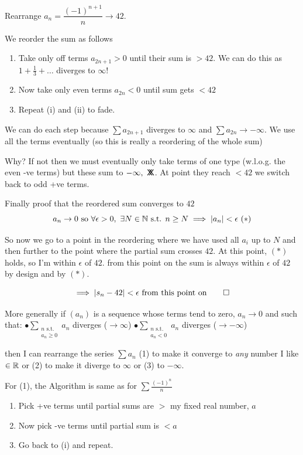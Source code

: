 \documentclass[twoside]{scrartcl}
\newcommand*{\cont}{%
  \mathsf{X}\mkern-8.5mu\mathsf{X}%
}
\begin{document}
\begin{example}
Rearrange $a_n = \dfrac{(-1)^{n+1}}{n} \to 42$. 

We reorder the sum as follows
\begin{enumerate}
\item Take only off terms $a_{2n+1} > 0$ until their sum is $>42$. We can do this as $1 + \frac{1}{3} + \dots$ diverges to $\infty$!
\item Now take only even terms $a_{2n} < 0$ until sum gets $<42$
\item Repeat (i) and (ii) to fade.
\end{enumerate}


We can do each step because $\sum a_{2n+1}$ diverges to $\infty$ and $\sum a_{2n}\to -\infty$. We use all the terms eventually (so this is really a reordering of the whole sum)

Why? If not then we must eventually only take terms of one type (w.l.o.g. the even -ve terms) but these sum to $-\infty,~\cont$. At point they reach $<42$ we switch back to odd +ve terms.

Finally proof that the reordered sum converges to $42$ 
\[a_n \to 0 \text{ so }\forall \epsilon >0,~\exists N \in\mathbb{N} \text{ s.t. } n \geq N \implies |a_n| < \epsilon ~(*)\]

So now we go to a point in the reordering where we have used all $a_i$ up to $N$ and then further to the point where the partial sum crosses $42$. At this point, $(*)$ holds, so I'm within $\epsilon$ of $42$. from this point on the sum is always within $\epsilon$ of $42$ by design and by $(*)$. 

\[\implies |s_n - 42| < \epsilon \text{ from this point on}\qed\]
\end{example}


More generally 
 if $(a_n)$ is a sequence whose terms tend to zero, $a_n \to 0$ and such that:\vspace*{5pt}
 \quad 
 $\bullet \displaystyle{\sum_{\substack{n \text{ s.t.} \\a_n \geq 0}} a_n}$ diverges ($\to \infty$) \quad 
 $\bullet \displaystyle{\sum_{\substack{n \text{ s.t.}\\ a_n < 0}}  a_n}$ diverges ($\to -\infty$)	
 
 then I can rearrange the series $\sum a_n$ (1) to make it converge to \emph{any} number I like $\in\mathbb{R}$ or (2) to  make it diverge to $\infty$ or (3) to $-\infty$. 
 
 For (1), the Algorithm is same as for $\sum \frac{(-1)^n}{n}$	
 \begin{enumerate}
 \item Pick +ve terms until partial sums are $>$ my fixed real number, $a$
 \item Now pick -ve terms until partial sum is $< a$
 \item Go back to (i) and repeat.
 \end{enumerate}\vspace*{5pt}
 
\end{document}
